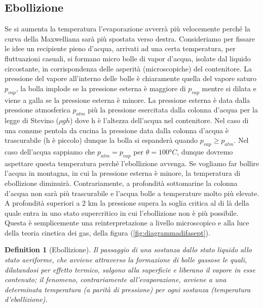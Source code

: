 \documentclass[10pt,a4paper]{article}
\newtheorem{definition}{Definition}
\begin{document}
\subsection{Ebollizione}
Se si aumenta la temperatura l'evaporazione avverrà più velocemente perché la curva della Maxwelliana sarà più spostata verso destra. Consideriamo per fissare le idee un recipiente pieno d'acqua, arrivati ad una certa temperatura, per fluttuazioni casuali, si formano micro bolle di vapor d'acqua, isolate dal liquido circostante, in corrispondenza delle asperità (microscopiche) del contenitore. La pressione del vapore all'interno delle bolle è chiaramente quella del vapore saturo $p_{vap}$, la bolla implode se la pressione esterna è maggiore di $p_{vap}$ mentre si dilata e viene a galla se la pressione esterna è minore. La pressione esterna è data dalla pressione atmosferica $p_{atm}$ più la pressione esercitata dalla colonna d'acqua per la legge di Stevino ($\rho g h$) dove h è l'altezza dell'acqua nel contenitore. Nel caso di una comune pentola da cucina la pressione data dalla colonna d'acqua è trascurabile (h è piccolo) dunque la bolla si espanderà quando $p_{vap} \geq p_{atm}$. Nel caso dell'acqua sappiamo che $p_{atm} = p_{vap}$ per $\theta = 100 °C$, dunque dovremo aspettare questa temperatura perché l'ebollizione avvenga. Se vogliamo far bollire l'acqua in montagna, in cui la pressione esterna è minore, la temperatura di ebollizione diminuirà. Contrariamente, a profondità sottomarine la colonna d'acqua non sarà più trascurabile e l'acqua bolle a temperature molto più elevate. A profondità superiori a 2 km la pressione supera la soglia critica al di là della quale entra in uno stato supercritico in cui l'ebollizione non è più possibile. Questa è semplicemente una reinterpretazione a livello microscopico e alla luce della teoria cinetica dei gas, della figura (\ref{fig:diagrammadifasept}). 
\begin{definition}[Ebollizione]
	Il passaggio di una sostanza dallo stato liquido allo stato aeriforme, che avviene attraverso la formazione di bolle gassose le quali, dilatandosi per effetto termico, salgono alla superficie e liberano il vapore in esse contenuto; il fenomeno, contrariamente all'evaporazione, avviene a una determinata temperatura (a parità di pressione) per ogni sostanza (temperatura d'ebollizione).
\end{definition}
\end{document}
